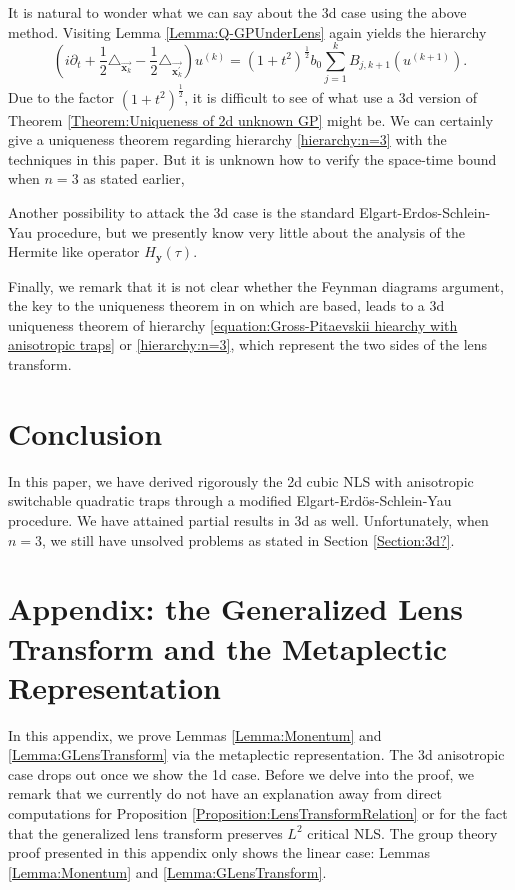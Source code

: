 \documentclass[reqno]{amsart}
\theoremstyle{plain}
\numberwithin{equation}{section}
\begin{document}
It is natural to wonder what we can say about the 3d case using the above
method. Visiting Lemma \ref{Lemma:Q-GPUnderLens} again yields the hierarchy\begin{equation}
\left( i\partial _{t}+\frac{1}{2}\triangle _{\overrightarrow{\mathbf{x}_{k}}}-\frac{1}{2}\triangle _{\overrightarrow{\mathbf{x}_{k}^{\prime }}}\right)
u^{(k)}=\left( 1+t^{2}\right) ^{\frac{1}{2}}b_{0}\sum_{j=1}^{k}B_{j,k+1}\left( u^{(k+1)}\right) .  \label{hierarchy:n=3}
\end{equation}Due to the factor $\left( 1+t^{2}\right) ^{\frac{1}{2}}$, it is difficult to
see of what use a 3d version of Theorem \ref{Theorem:Uniqueness of 2d
unknown GP} might be. We can certainly give a uniqueness theorem regarding
hierarchy \ref{hierarchy:n=3} with the techniques in this paper. But it is
unknown how to verify the space-time bound when $n=3$ as stated earlier,

Another possibility to attack the 3d case is the standard
Elgart-Erdos-Schlein-Yau procedure, but we presently know very little about
the analysis of the Hermite like operator $H_{\mathbf{y}}(\tau )$.

Finally, we remark that it is not clear whether the Feynman diagrams
argument, the key to the uniqueness theorem in \cite{E-S-Y2} on which \cite{E-S-Y1,E-S-Y2,E-S-Y4, E-S-Y5, E-S-Y3} are based, leads to a 3d uniqueness
theorem of hierarchy \ref{equation:Gross-Pitaevskii hiearchy with
anisotropic traps} or \ref{hierarchy:n=3}, which represent the two sides of
the lens transform.

\section{Conclusion}

In this paper, we have derived rigorously the 2d cubic NLS with anisotropic
switchable quadratic traps through a modified Elgart-Erd\"{o}s-Schlein-Yau
procedure. We have attained partial results in 3d as well. Unfortunately,
when $n=3$, we still have unsolved problems as stated in Section \ref{Section:3d?}.

\section{Appendix: the Generalized Lens Transform and the Metaplectic
Representation}

In this appendix, we prove Lemmas \ref{Lemma:Monentum} and \ref{Lemma:GLensTransform} via the metaplectic representation. The 3d
anisotropic case drops out once we show the 1d case. Before we delve into
the proof, we remark that we currently do not have an explanation away from
direct computations for Proposition \ref{Proposition:LensTransformRelation}
or for the fact that the generalized lens transform preserves $L^{2}$
critical NLS. The group theory proof presented in this appendix only shows
the linear case: Lemmas \ref{Lemma:Monentum} and \ref{Lemma:GLensTransform}.
\end{document}
